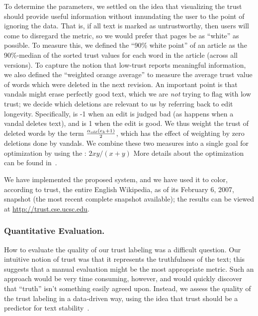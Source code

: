 To determine the parameters, we settled on the idea that
visualizing the trust should provide useful information
without innundating the user to the point of ignoring
the data.
That is, if all text is marked as untrustworthy,
then users will come to disregard the metric,
so we would prefer that pages be as ``white'' as possible.
To measure this, we defined the ``90\% white point'' of an
article as the 90\%-median
of the sorted trust values for each word in the article
(across all versions).
To capture the notion that low-trust reports meaningful
information, we also defined the ``weighted orange average''
to measure the average trust value of words which were
deleted in the next revision.
An important point is that vandals might erase perfectly good
text, which we are \textit{not} trying to flag with low trust;
we decide which deletions are relevant to us by referring back
to edit longevity.
Specifically, \elong is -1 when an edit is judged bad (as happens
when a vandal deletes text), and \elong is 1 when the edit is good.
We thus weight the trust of deleted words by the term
$\frac{\alpha_\text{\textit{edit}}(e_{k} + 1)}{2}$,
which has the effect of weighting by zero deletions done by vandals.
We combine these two measures into a single goal for optimization
by using the : $2 x y / (x+y)$
More details about the optimization can be found
in~\cite{WikiTrust2008}.


We have implemented the proposed system, and we have used it to color,
according to trust, the entire English Wikipedia, as of its February
6, 2007, snapshot (the most recent complete snapshot available);
the results can be viewed at \url{http://trust.cse.ucsc.edu}.

\subsubsection*{Quantitative Evaluation.}

How to evaluate the quality of our trust labeling was
a difficult question.
Our intuitive notion of trust was that it represents
the truthfulness of the text; this suggests that a manual
evaluation might be the most appropriate metric.
Such an approach would be very time consuming, however, and would
quickly discover that ``truth'' isn't something easily agreed upon.
Instead, we assess the quality of the trust labeling in a
data-driven way, using the idea that
trust should be a predictor for text stability~\cite{McGuinness06}.

